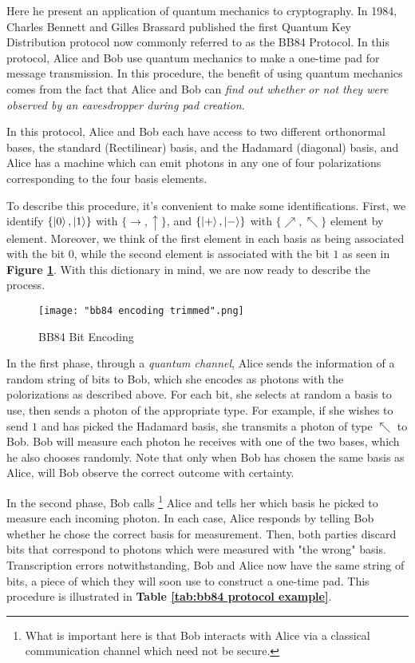 Here he present an application of quantum mechanics to cryptography.  In 1984, Charles Bennett and Gilles Brassard published the first Quantum Key Distribution protocol \cite{Bennett1984} now commonly referred to as the BB84 Protocol. In this protocol, Alice and Bob use quantum mechanics to make a one-time pad for message transmission.  In this procedure, the benefit of using quantum mechanics comes from the fact that Alice and Bob can {\emph{find out whether or not they were observed by an eavesdropper during pad creation}}. 

In this protocol, Alice and Bob each have access to two different orthonormal bases, the standard (Rectilinear) basis, and the Hadamard (diagonal) basis, and Alice has a machine which can emit photons in any one of four polarizations corresponding to the four basis elements.  

To describe this procedure, it's convenient to make some identifications.  First, we identify $\{\ket{0},\ket{1}\}$ with $\{\rightarrow, \uparrow\}$, and $\{\ket{+}, \ket{-}\}$ with $\{\nearrow, \nwarrow\}$ element by element.  Moreover, we think of the first element in each basis as being associated with the bit $0$, while the second element is associated with the bit $1$ as seen in \textbf{Figure \ref{fig:BB84 bit encoding}}.  With this dictionary in mind, we are now ready to describe the process.

\begin{figure}[h]
    \centering
    \texttt{[image: "bb84 encoding trimmed".png]}
    \caption{BB84 Bit Encoding \protect\footnotemark}
    \label{fig:BB84 bit encoding}
\end{figure}



In the first phase, through a {\emph{quantum channel}}, Alice sends the information of a random string of bits to Bob, which she encodes as photons with the polorizations as described above. For each bit, she selects at random a basis to use, then sends a photon of the appropriate type.  For example, if she wishes to send $1$ and has picked the Hadamard basis, she transmits a photon of type $\nwarrow$ to Bob.  Bob will measure each photon he receives with one of the two bases, which he also chooses randomly. Note that only when Bob has chosen the same basis as Alice, will Bob observe the correct outcome with certainty.  

In the second phase, Bob calls \footnote{What is important here is that Bob interacts with Alice via a classical communication channel which need not be secure.} Alice and tells her which basis he picked to measure each incoming photon. In each case, Alice responds by telling Bob whether he chose the correct basis for measurement. Then, both parties discard bits that correspond to photons which were measured with "the wrong" basis. Transcription errors notwithstanding, Bob and Alice now have the same string of bits, a piece of which they will soon use to construct a one-time pad.  This procedure is illustrated in \textbf{Table \ref{tab:bb84 protocol example}}.

